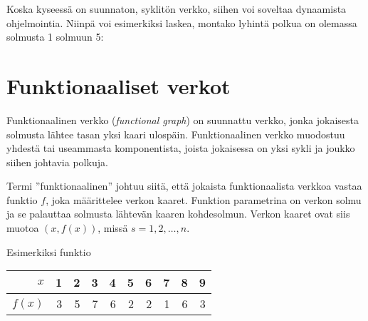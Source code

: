 Koska kyseessä on suunnaton, syklitön verkko,
siihen voi soveltaa dynaamista ohjelmointia.
Niinpä voi esimerkiksi laskea, montako lyhintä polkua
on olemassa solmusta 1 solmuun 5:
\begin{center}
\end{center}


\section{Funktionaaliset verkot}

Funktionaalinen verkko (\textit{functional graph})
on suunnattu verkko, jonka jokaisesta solmusta lähtee
tasan yksi kaari ulospäin.
Funktionaalinen verkko muodostuu yhdestä tai
useammasta komponentista, joista jokaisessa
on yksi sykli ja joukko siihen johtavia polkuja.

Termi ''funktionaalinen'' johtuu siitä,
että jokaista funktionaalista verkkoa vastaa
funktio $f$, joka määrittelee verkon kaaret.
Funktion parametrina on verkon solmu ja
se palauttaa solmusta lähtevän kaaren kohdesolmun.
Verkon kaaret ovat siis muotoa $(x,f(x))$,
missä $s=1,2,\ldots,n$.

\begin{samepage}
Esimerkiksi funktio

\begin{center}
\begin{tabular}{r|rrrrrrrrr}
$x$ & 1 & 2 & 3 & 4 & 5 & 6 & 7 & 8 & 9 \\
\hline
$f(x)$ & 3 & 5 & 7 & 6 & 2 & 2 & 1 & 6 & 3 \\
\end{tabular}
\end{center}
\end{samepage}

